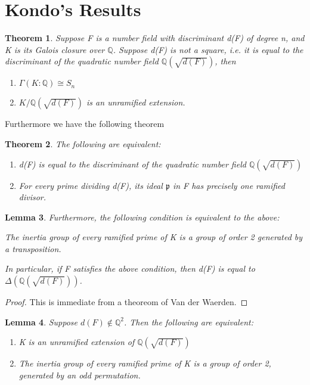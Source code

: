 \documentclass[preprint,12pt,reqno]{elsarticle}
\newtheorem{theorem}{Theorem}
\newtheorem{lemma}[theorem]{Lemma}
\begin{document}
\section{Kondo's Results}
\begin{theorem}
    Suppose F is a number field with discriminant d(F) of degree n, and K is its Galois closure over $\mathbb{Q}$. Suppose d(F) is not a square, i.e. it is equal to the discriminant of the quadratic number field $\mathbb{Q}(\sqrt{d(F)})$, then \begin{enumerate}
        \item $\Gamma(K:\mathbb{Q})\cong S_n$
        \item $K/\mathbb{Q}(\sqrt{d(F)})$ is an unramified extension.
    \end{enumerate}
\end{theorem}
Furthermore we have the following theorem \begin{theorem}
    The following are equivalent: \begin{enumerate}
        \item d(F) is equal to the discriminant of the quadratic number field $\mathbb{Q}(\sqrt{d(F)})$
        \item For every prime dividing d(F), its ideal $\mathfrak{p}$ in F has precisely one ramified divisor.
    \end{enumerate}
\end{theorem}
\begin{lemma}
Furthermore, the following condition is equivalent to the above:
\par
    The inertia group of every ramified prime of K is a group of order 2 generated by a transposition.\par
In particular, if F satisfies the above condition, then d(F) is equal to $\Delta(\mathbb{Q}(\sqrt{d(F)}))$.
\end{lemma}
\begin{proof}
This is immediate from a theoreom of Van der Waerden. 
\end{proof}
\begin{lemma}
Suppose $d(F)\notin \mathbb{Q}^2$. Then the following are equivalent:\begin{enumerate}
    \item K is an unramified extension of $\mathbb{Q}(\sqrt{d(F)})$
    \item The inertia group of every ramified prime of K is a group of order 2, generated by an odd permutation. 
\end{enumerate}
\end{lemma} 
\end{document}
